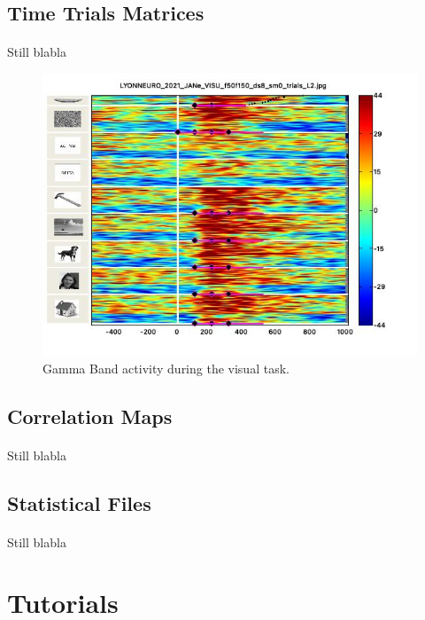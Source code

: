 \documentclass[a4paper]{article}
\begin{document}
\subsection{Time Trials Matrices}
\paragraph{} Still blabla
\begin{figure}[H]
\begin{center}
\includegraphics[scale=0.7]{TimeTrialsMatrice.jpg}
\end{center}
\caption{\label{TimeTrialsPicture}Gamma Band activity during the visual task.}
\end{figure}
\subsection{Correlation Maps}
\paragraph{} Still blabla
\subsection{Statistical Files}
\paragraph{} Still blabla

\newpage
\section{Tutorials} \label{tutorials}    
\end{document}
